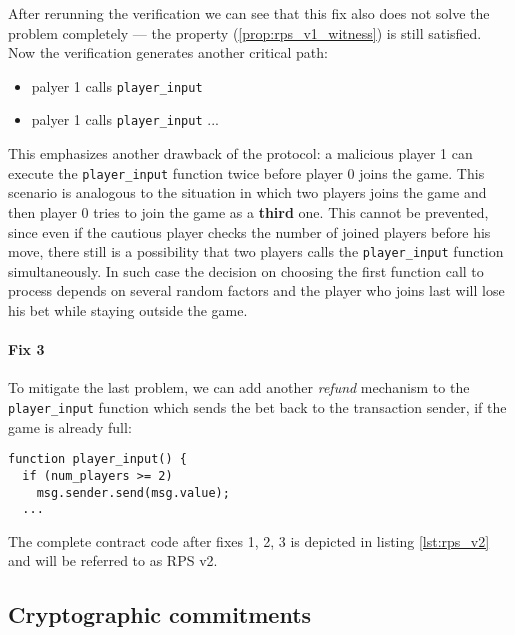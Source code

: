 After rerunning the verification we can see that this fix also does not solve the problem completely --- the property 
(\ref{prop:rps_v1_witness}) is still satisfied.
Now the verification generates another critical path:
\begin{itemize}
\item palyer 1 calls \lstinline{player_input}
\item palyer 1 calls \lstinline{player_input}
...
\end{itemize}
This emphasizes another drawback of the protocol:
a malicious player 1 can execute the \lstinline{player_input} function twice before player 0 joins the game.
This scenario is analogous to the situation in which two players joins the game and then player 0 tries to join
the game as a \textbf{third} one.
This cannot be prevented, since even if the cautious player checks the number of joined players before his move,
there still is a possibility that two players calls the \lstinline{player_input} function simultaneously.
In such case the decision on choosing the first function call to process depends on several random factors and the player
who joins last will lose his bet while staying outside the game.

\paragraph{Fix 3}

To mitigate the last problem, we can add another \emph{refund} mechanism to the \lstinline{player_input} function
which sends the bet back to the transaction sender, if the game is already full:
\begin{lstlisting}
function player_input() {
  if (num_players >= 2)
    msg.sender.send(msg.value);
  ...
\end{lstlisting}

The complete contract code after fixes 1, 2, 3 is depicted in listing \ref{lst:rps_v2} and will be referred to as RPS v2.



\subsection{Cryptographic commitments}

